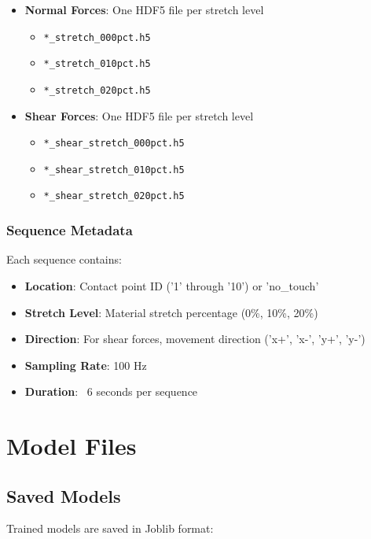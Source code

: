 \documentclass[11pt,a4paper]{article}
\begin{document}
\begin{itemize}
    \item \textbf{Normal Forces}: One HDF5 file per stretch level
    \begin{itemize}
        \item \texttt{*\_stretch\_000pct.h5}
        \item \texttt{*\_stretch\_010pct.h5}
        \item \texttt{*\_stretch\_020pct.h5}
    \end{itemize}
    
    \item \textbf{Shear Forces}: One HDF5 file per stretch level
    \begin{itemize}
        \item \texttt{*\_shear\_stretch\_000pct.h5}
        \item \texttt{*\_shear\_stretch\_010pct.h5}
        \item \texttt{*\_shear\_stretch\_020pct.h5}
    \end{itemize}
\end{itemize}

\subsubsection{Sequence Metadata}

Each sequence contains:
\begin{itemize}
    \item \textbf{Location}: Contact point ID ('1' through '10') or 'no\_touch'
    \item \textbf{Stretch Level}: Material stretch percentage (0\%, 10\%, 20\%)
    \item \textbf{Direction}: For shear forces, movement direction ('x+', 'x-', 'y+', 'y-')
    \item \textbf{Sampling Rate}: 100 Hz
    \item \textbf{Duration}: ~6 seconds per sequence
\end{itemize}

\section{Model Files}

\subsection{Saved Models}

Trained models are saved in Joblib format:
\end{document}
